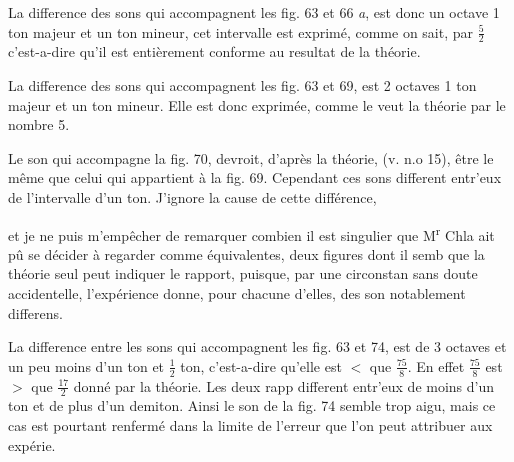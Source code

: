 \documentclass[11pt,a4paper]{article}
\begin{document}
La difference des sons qui accompagnent les fig. 63 et 66 \emph{a}, est donc un octave
1 ton majeur et un ton mineur, cet intervalle est exprimé, comme on sait, par
$\frac{5}{2}$ c'est-a-dire qu'il est entièrement conforme au resultat de la théorie.

La difference des sons qui accompagnent les fig. 63 et 69, est 2 octaves 1 ton
majeur et un ton mineur. Elle est donc exprimée, comme le veut la théorie par
le nombre 5.

Le son qui accompagne la fig. 70, devroit, d'après la théorie, (v. n.o 15), être
le même que celui qui appartient à la fig. 69. Cependant ces sons different
entr'eux de l'intervalle d'un ton. J'ignore la cause de cette différence,


et je ne puis m'empêcher de remarquer combien il est singulier que M\textsuperscript{r} Chla
ait pû se décider à regarder comme équivalentes, deux figures dont il semb
que la théorie seul peut indiquer le rapport, puisque, par une circonstan
sans doute accidentelle, l'expérience donne, pour chacune d'elles, des son
notablement differens.

La difference entre les sons qui accompagnent les fig. 63 et 74, est de 3
octaves et un peu moins d'un ton et $\frac{1}{2}$ ton, c'est-a-dire qu'elle est
$<$ que $\frac{75}{8}$. En effet $\frac{75}{8}$ est $>$ que $\frac{17}{2}$ donné par la théorie. Les deux rapp
different entr'eux de moins d'un ton et de plus d'un demiton. Ainsi
le son de la fig. 74 semble trop aigu, mais ce cas est pourtant
renfermé dans la limite de l'erreur que l'on peut attribuer aux expérie.
\end{document}
